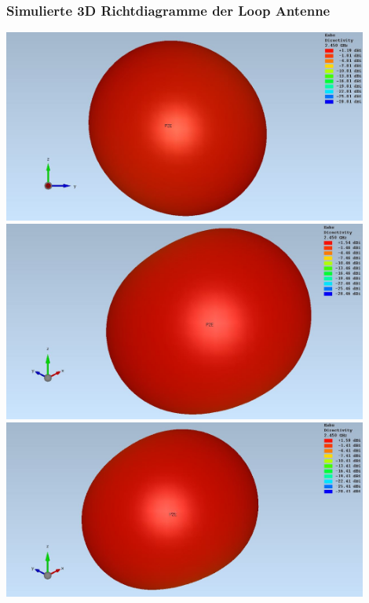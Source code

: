 \subsubsection{Simulierte 3D Richtdiagramme der Loop Antenne}
{
\centering
\includegraphics[width=0.9\textwidth]{content/bilder/Evaluation/Loop/L2/ohneABS/EM_Far_Field_Loop_Lambda2_ohneABS.JPG}
\label{fig:sim_Loop_freiraum_3D}
\medskip
\includegraphics[width=0.9\textwidth]{content/bilder/Evaluation/Loop/L2/1ABS/EM_Far_Field_Loop_Lambda2_mitABS.JPG}
\label{fig:sim_Loop_freiraum_3D_1ABS}
\medskip
\includegraphics[width=0.9\textwidth]{content/bilder/Evaluation/Loop/L2/2ABS/EM_Far_Field_Loop_Lambda2_mit2ABS.JPG}
\label{fig:sim_Loop_freiraum_3D_2ABS}
}

